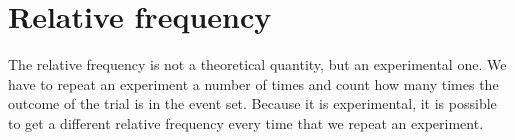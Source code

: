 \section{Relative frequency}


The relative frequency is not a theoretical quantity, but an
experimental one. We have to repeat an experiment a number of times
and count how many times the outcome of the trial is in the event
set. Because it is experimental, it is possible to get a different
relative frequency every time that we repeat an experiment.\par
{}
